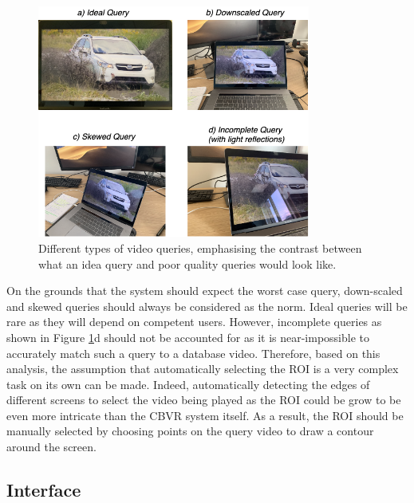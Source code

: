 \begin{figure}[h]
\centerline{\includegraphics[width=0.8\textwidth]{figures/design/difference-query-video-issues.png}}
\caption{\label{fig:difference-query-video-issues}Different types of video queries, emphasising the contrast between what an idea query and poor quality queries would look like.}
\end{figure}

On the grounds that the system should expect the worst case query, down-scaled and skewed queries should always be considered as the norm. Ideal queries will be rare as they will depend on competent users. However, incomplete queries as shown in Figure \ref{fig:difference-query-video-issues}d should not be accounted for as it is near-impossible to accurately match such a query to a database video. Therefore, based on this analysis, the assumption that automatically selecting the ROI is a very complex task on its own can be made. Indeed, automatically detecting the edges of different screens to select the video being played as the ROI could be grow to be even more intricate than the CBVR system itself. As a result, the ROI should be manually selected by choosing points on the query video to draw a contour around the screen. 

\subsection{Interface}

